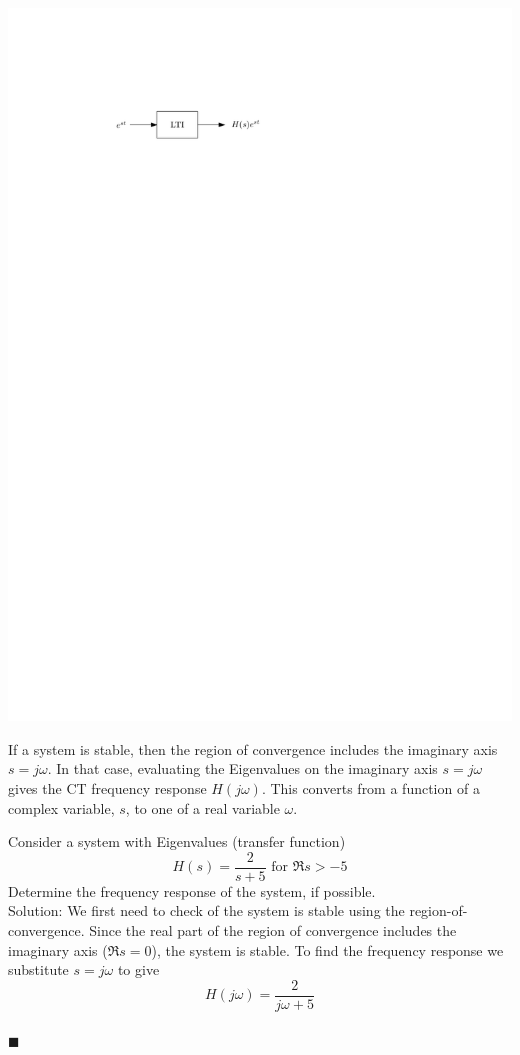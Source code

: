 \begin{center}
  \includegraphics[scale=1]{graphics/18-ct-tf.pdf}
\end{center}

If a system is stable, then the region of convergence includes the imaginary axis $s = j\omega$. In that case, evaluating the Eigenvalues on the imaginary axis $s = j\omega$ gives the CT frequency response $H(j\omega)$. This converts from a function of a complex variable, $s$, to one of a real variable $\omega$.

\begin{example} Consider a system with Eigenvalues (transfer function)
  \[
  H(s) = \frac{2}{s+5}\mbox{ for } \Re{s} > -5
  \]
  Determine the frequency response of the system, if possible.\\

  Solution: We first need to check of the system is stable using the region-of-convergence. Since the real part of the region of convergence includes the imaginary axis ($\Re s = 0$), the system is stable. To find the frequency response we substitute $s = j\omega$ to give
  \[
  H(j\omega) = \frac{2}{j\omega+5}
  \]
  \\$\blacksquare$
\end{example}

